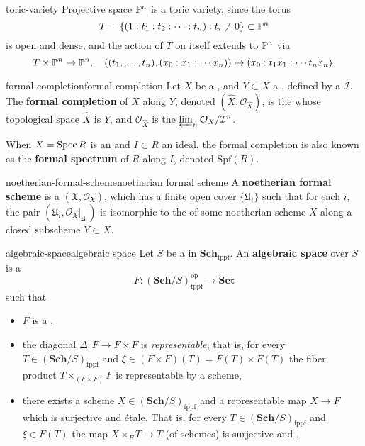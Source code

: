 \begin{example}{toric-variety}
    Projective space $\mathbb{P}^n$ is a toric variety, since the torus
    \[ T = \{ (1 : t_1 : t_2 : \cdots : t_n) : t_i \ne 0 \} \subset \mathbb{P}^n \]
    is open and dense, and the action of $T$ on itself extends to $\mathbb{P}^n$ via
    \[ T \times \mathbb{P}^n \to \mathbb{P}^n, \quad \left( (t_1, \ldots, t_n), (x_0 : x_1 : \cdots x_n) \right) \mapsto (x_0 : t_1 x_1 : \cdots t_n x_n) . \]
\end{example}

\begin{topic}{formal-completion}{formal completion}
    Let $X$ be a  , and $Y \subset X$ a , defined by a  $\mathcal{I}$. The \textbf{formal completion} of $X$ along $Y$, denoted $(\hat{X}, \mathcal{O}_{\hat{X}})$, is the  whose topological space $\hat{X}$ is $Y$, and $\mathcal{O}_{\hat{X}}$ is the  $\varprojlim_n \mathcal{O}_X / \mathcal{I}^n$.
    
    When $X = \operatorname{Spec} R$ is an  and $I \subset R$ an ideal, the formal completion is also known as the \textbf{formal spectrum} of $R$ along $I$, denoted $\text{Spf}(R)$.
\end{topic}

\begin{topic}{noetherian-formal-scheme}{noetherian formal scheme}
    A \textbf{noetherian formal scheme} is a  $(\mathfrak{X}, \mathcal{O}_\mathfrak{X})$, which has a finite open cover $\{ \mathfrak{U}_i \}$ such that for each $i$, the pair $(\mathfrak{U}_i, \mathcal{O}_\mathfrak{X}|_{\mathfrak{U}_i})$ is isomorphic to the  of some noetherian scheme $X$ along a closed subscheme $Y \subset X$.
\end{topic}

\begin{topic}{algebraic-space}{algebraic space}
    Let $S$ be a  in $\textbf{Sch}_\text{fppf}$. An \textbf{algebraic space} over $S$ is a 
    \[ F : (\textbf{Sch}/S)_\text{fppf}^\text{op} \to \textbf{Set} \]
    such that
    \begin{itemize}
        \item $F$ is a ,
        \item the diagonal $\Delta : F \to F \times F$ is \textit{representable}, that is, for every $T \in (\textbf{Sch}/S)_\text{fppf}$ and $\xi \in (F \times F)(T) = F(T) \times F(T)$ the fiber product $T \times_{(F \times F)} F$ is representable by a scheme,
        \item there exists a scheme $X \in (\textbf{Sch}/S)_\text{fppf}$ and a representable map $X \to F$ which is surjective and étale. That is, for every $T \in (\textbf{Sch}/S)_\text{fppf}$ and $\xi \in F(T)$ the map $X \times_F T \to T$ (of schemes) is surjective and .
    \end{itemize}
\end{topic}

